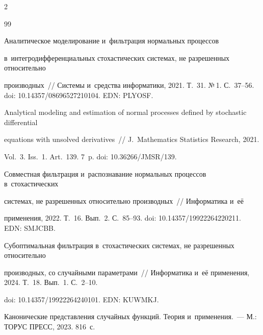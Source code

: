 \begin{multicols}{2}
{{\begin{thebibliography}{99}



Аналитическое моделирование и~фильт\-ра\-ция нормальных процессов 

в~интегродифференциальных стохастических сис\-те\-мах, не разрешенных относительно 

производных~// Сис\-те\-мы и~средства информатики, 2021. Т.~31. №\,1. С.~37--56.  doi: 10.14357/08696527210104. EDN: PLYOSF.






Analytical modeling and estimation of normal processes defined by stochastic differential

equations with unsolved derivatives~// J.~Mathematics Statistics Research, 2021. 

Vol.~3. Iss.~1. Art.~139. 7~p. doi: 10.36266/\linebreak JMSR/139. 






Совместная фильт\-ра\-ция и~распознавание нормальных процессов в~стохастических 

сис\-те\-мах, не разрешенных относительно производных~// Информатика и~её 

применения, 2022. Т.~16. Вып.~2. С.~85--93. doi: 10.14357/19922264220211. EDN: SMJCBB.






Субоптимальная фильт\-ра\-ция в~стохастических сис\-те\-мах, не разрешенных относительно 

производных, со случайными параметрами~// Информатика и~её применения,  2024. Т.~18. Вып.~1. С.~2--10.

doi: 10.14357/19922264240101. EDN: KUWMKJ.






Канонические представления случайных функций. Тео\-рия и~применения.~--- М.: ТОРУС ПРЕСС, 2023. 816~с.








\end{thebibliography}}}
\end{multicols}
